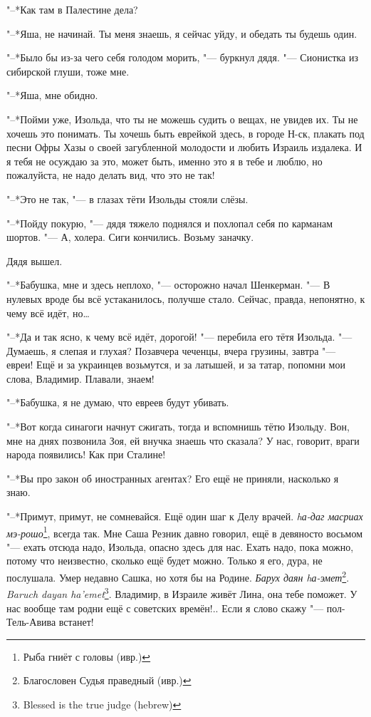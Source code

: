 "--*Как там в Палестине дела?

"--*Яша, не начинай.
Ты меня знаешь, я сейчас уйду, и обедать ты будешь один.

"--*Было бы из-за чего себя голодом морить, "--- буркнул дядя.
"--- Сионистка из сибирской глуши, тоже мне.

"--*Яша, мне обидно.

"--*Пойми уже, Изольда, что ты не можешь судить о вещах, не увидев их.
Ты не хочешь это понимать.
Ты хочешь быть еврейкой здесь, в городе Н-ск, плакать под песни Офры Хазы о своей загубленной молодости и любить Израиль издалека.
И я тебя не осуждаю за это, может быть, именно это я в тебе и люблю, но пожалуйста, не надо делать вид, что это не так!

"--*Это не так, "--- в глазах тёти Изольды стояли слёзы.

"--*Пойду покурю, "--- дядя тяжело поднялся и похлопал себя по карманам шортов.
"--- А, холера.
Сиги кончились.
Возьму заначку.

Дядя вышел.

"--*Бабушка, мне и здесь неплохо, "--- осторожно начал Шенкерман.
"--- В нулевых вроде бы всё устаканилось, получше стало.
Сейчас, правда, непонятно, к чему всё идёт, но\ldots{}

"--*Да и так ясно, к чему всё идёт, дорогой! "--- перебила его тётя Изольда.
"--- Думаешь, я слепая и глухая?
Позавчера чеченцы, вчера грузины, завтра "--- евреи!
Ещё и за украинцев возьмутся, и за латышей, и за татар, попомни мои слова, Владимир.
Плавали, знаем!

"--*Бабушка, я не думаю, что евреев будут убивать.

"--*Вот когда синагоги начнут сжигать, тогда и вспомнишь тётю Изольду.
Вон, мне на днях позвонила Зоя, ей внучка знаешь что сказала?
У нас, говорит, враги народа появились!
Как при Сталине!

"--*Вы про закон об иностранных агентах?
Его ещё не приняли, насколько я знаю.

"--*Примут, примут, не сомневайся.
Ещё один шаг к Делу врачей.
\textit{hа-даг масриах мэ-рошо}\footnote{Рыба гниёт с головы (ивр.)}, всегда так.
Мне Саша Резник давно говорил, ещё в девяносто восьмом "--- ехать отсюда надо, Изольда, опасно здесь для нас.
Ехать надо, пока можно, потому что неизвестно, сколько ещё будет можно.
Только я его, дура, не послушала.
Умер недавно Сашка, но хотя бы на Родине.
{\textit{Барух даян hа-эмет}\footnote{Благословен Судья праведный (ивр.)}.}
{\textit{Baruch dayan ha'emet}\footnote{Blessed is the true judge (hebrew)}.}
Владимир, в Израиле живёт Лина, она тебе поможет.
У нас вообще там родни ещё с советских времён!..
Если я слово скажу "--- пол-Тель-Авива встанет!

